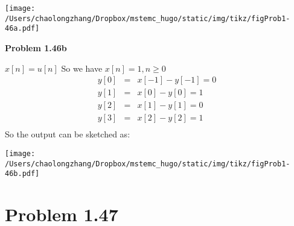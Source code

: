\documentclass[koma,a4paper,utopia,12pt,listings-color,microtype,paralist,colorlinks,urlcolor=red]{org-article}
\begin{document}
\begin{center}
\texttt{[image: /Users/chaolongzhang/Dropbox/mstemc\_hugo/static/img/tikz/figProb1-46a.pdf]}
\end{center}

\textbf{Problem 1.46b}



\(x[n] = u[n]\) So  we have \(x[n] = 1, n\geq 0\)
\begin{eqnarray*}
y[0]&=& x[-1] - y[-1] = 0 \\
y[1]&=& x[0] - y[0] = 1 \\
y[2]&=& x[1] - y[1] = 0 \\
y[3]&=& x[2] - y[2] = 1 \\
\end{eqnarray*}
So the output can be sketched as:

\begin{center}
\texttt{[image: /Users/chaolongzhang/Dropbox/mstemc\_hugo/static/img/tikz/figProb1-46b.pdf]}
\end{center}
\section{Problem 1.47}
\label{sec:org09ffb49}
\end{document}
